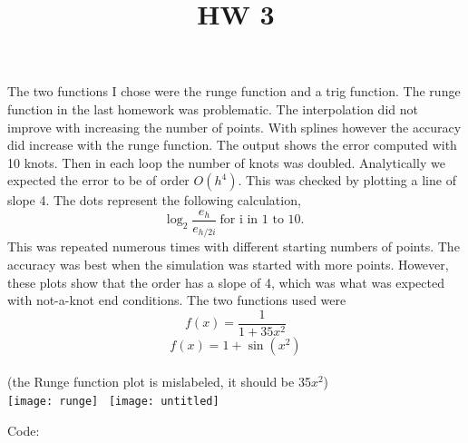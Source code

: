 \documentclass[]{article}
\title{HW 3}
\begin{document}
\maketitle
The two functions I chose were the runge function and a trig function. The runge function in the last homework was problematic. The interpolation did not improve with increasing the number of points. With splines however the accuracy did increase with the runge function. The output shows the error computed with 10 knots. Then in each loop the number of knots was doubled. Analytically we expected the error to be of order $ O(h^4) $. This was checked by plotting a line of slope 4. The dots represent the following calculation, 
\[ \log_2\frac{e_h}{e_{h/2i}} \   \text{for i in 1 to 10. }\] 
This was repeated numerous times with different starting numbers of points. The accuracy was best when the simulation was started with more points. However, these plots show that the order has a slope of 4, which was what was expected with not-a-knot end conditions. The two functions used were
\[ f(x) = \frac{1}{1+35x^2} \] 
\[ f(x) = 1 + \sin(x^2) \]\\
(the Runge function plot is mislabeled, it should be 35$ x^2 $) \\
\centering
\texttt{[image: runge]} \ \texttt{[image: untitled]}	

Code: \\



	
	
	
	
	
	
	
\end{document}
